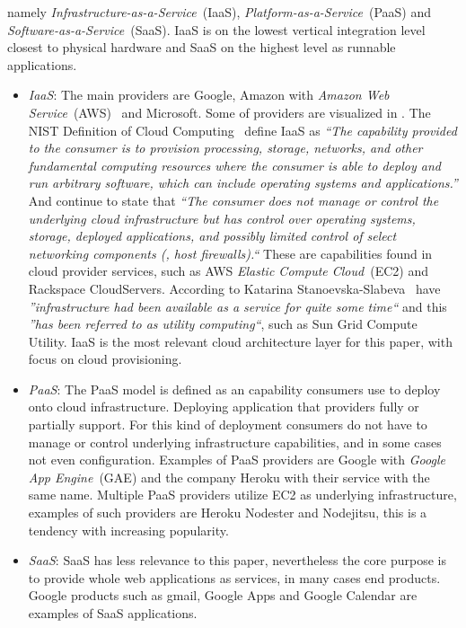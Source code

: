 namely \emph{Infrastructure-as-a-Service}~(IaaS), \emph{Platform-as-a-Service}~(PaaS)
and \emph{Software-as-a-Service}~(SaaS).
IaaS is on the lowest vertical integration level closest to physical hardware and SaaS on the highest
level as runnable applications.
\begin{itemize}
  \item \emph{IaaS}: 
    The main providers are Google, Amazon with \emph{Amazon Web Service}~(AWS)~\cite{aws} and Microsoft.
    Some of providers are visualized in .
    The NIST Definition of Cloud Computing~\cite{nist:mell11} define IaaS as
    \emph{``The capability provided to the consumer is to provision 
    processing, storage, networks, and other fundamental computing resources where the 
    consumer is able to deploy and run arbitrary software, which can include operating 
    systems and applications.''}
    And continue to state that \emph{``The consumer does not manage or control the underlying cloud 
    infrastructure but has control over operating systems, storage, deployed applications, and 
    possibly limited control of select networking components (\eg, host firewalls).``}
    These are capabilities found in cloud provider services, 
    such as AWS \emph{Elastic Compute Cloud}~(EC2) and Rackspace CloudServers.
    According to Katarina Stanoevska-Slabeva~\cite{introduction:wozniak10} have 
    \emph{''infrastructure had been available as a service for quite some time``} and this 
    \emph{''has been referred to as utility computing``}, such as Sun Grid Compute Utility.
    IaaS is the most relevant cloud architecture layer for this paper, with focus
    on cloud provisioning.
  \item \emph{PaaS}:
    The PaaS model is defined as an capability consumers use to deploy onto cloud infrastructure.
    Deploying application that providers fully or partially support. For this kind of deployment
    consumers do not have to manage or control underlying infrastructure capabilities,
    and in some cases not even configuration.
    Examples of PaaS providers are Google with \emph{Google App Engine}~(GAE) and
    the company Heroku with their service with the same name.
    Multiple PaaS providers utilize EC2 as underlying infrastructure, examples of such
    providers are Heroku Nodester and Nodejitsu, this is a tendency with increasing popularity.
  \item \emph{SaaS}:
    SaaS has less relevance to this paper, nevertheless the core purpose
    is to provide whole web applications as services, in many cases end products.
    Google products such as gmail, Google Apps and  Google Calendar are examples of 
    SaaS applications.
\end{itemize}

